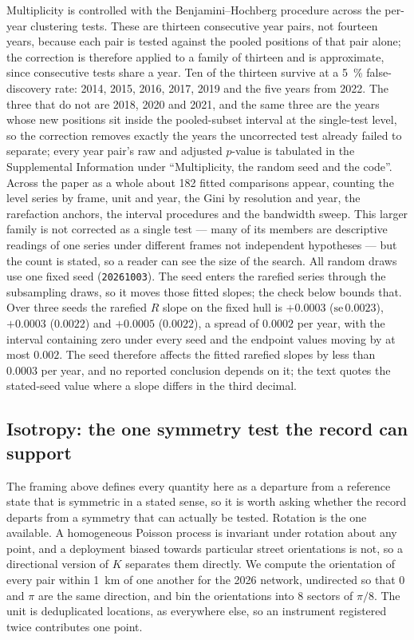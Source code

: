 \documentclass[fleqn,10pt,lineno]{wlpeerj}
\newcommand{\nComp}{182}
\newcommand{\randSeed}{20261003}
\begin{document}
Multiplicity is controlled with the Benjamini--Hochberg procedure
\citep{benjamini1995controlling} across the per-year clustering tests. These are thirteen
consecutive year pairs, not fourteen years, because each pair is tested against the pooled
positions of that pair alone; the correction is therefore applied to a family of thirteen and is
approximate, since consecutive tests share a year. Ten of the thirteen survive at a
\SI{5}{\percent} false-discovery rate: 2014, 2015, 2016, 2017, 2019 and the five years from 2022.
The three that do not are 2018, 2020 and 2021, and the same three are the years whose new
positions sit inside the pooled-subset interval at the single-test level, so the correction
removes exactly the years the uncorrected test already failed to separate; every year pair's raw
and adjusted $p$-value is tabulated in the Supplemental Information under ``Multiplicity, the random
seed and the code''.
Across the paper as a whole about \nComp{} fitted comparisons appear, counting the level
series by frame, unit and year, the Gini by resolution and year, the rarefaction anchors, the
interval procedures and the bandwidth sweep. This larger family is not corrected as a single
test --- many of its members are descriptive readings of one series under different frames
not independent hypotheses --- but the count is stated, so a reader can see the size of
the search.
All random draws use one fixed seed (\texttt{\randSeed}). The seed enters the rarefied series
through the subsampling draws, so it moves those fitted slopes; the check below bounds that.
Over three seeds the rarefied $R$ slope on the fixed hull is
$+0.0003$ ($\mathrm{se}\,0.0023$), $+0.0003$ ($0.0022$) and $+0.0005$ ($0.0022$), a spread of
$0.0002$ per year, with the interval containing zero under every seed and the endpoint values
moving by at most $0.002$. The seed therefore affects the fitted rarefied slopes by less than
$0.0003$ per year, and no reported conclusion depends on it; the text quotes the stated-seed
value where a slope differs in the third decimal.

\subsection*{Isotropy: the one symmetry test the record can support}
\label{sec:isotropy}

The framing above defines every quantity here as a departure from a reference state that is
symmetric in a stated sense, so it is worth asking whether the record departs from a symmetry
that can actually be tested. Rotation is the one available. A homogeneous Poisson process is
invariant under rotation about any point, and a deployment biased towards particular street
orientations is not, so a directional version of $K$ separates them directly. We compute the
orientation of every pair within \SI{1}{\kilo\meter} of one another for the 2026 network,
undirected so that $0$ and $\pi$ are the same direction, and bin the orientations into
\num{8} sectors of $\pi/8$. The unit is deduplicated locations, as everywhere else, so an
instrument registered twice contributes one point.
\end{document}
